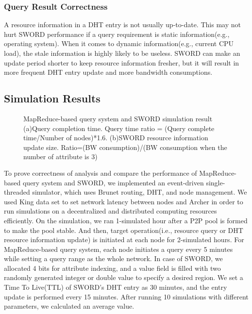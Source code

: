 \documentclass{acm_proc_article-sp}
\begin{document}
\subsubsection{Query Result Correctness}
A resource information in a DHT entry is not usually up-to-date. This may not hurt SWORD performance if a query requirement is static information(e.g., operating system). 
When it comes to dynamic information(e.g., current CPU load), the stale information is highly likely to be useless. 
SWORD can make an update period shorter to keep resource information fresher, but it will result in more frequent DHT entry update and more bandwidth consumptions.
\subsection{Simulation Results}
\begin{figure}[t]
\centering
{}
\caption{\label{fig:sim}MapReduce-based query system and SWORD simulation result (a)Query completion time. Query time ratio = (Query complete time/Number of nodes)*1.6. 
(b)SWORD resource information update size. Ratio=(BW consumption)/(BW consumption when the number of attribute is 3)}
\end{figure}
To prove correctness of analysis and compare the performance of MapReduce-based query system and SWORD, we implemented an event-driven single-threaded simulator, which uses Brunet\cite{brunet} routing, DHT, and node management.
We used King data set\cite{king} to set network latency between nodes and Archer\cite{archer} in order to run simulations on a decentralized and distributed computing resources efficiently. 
On the simulation, we ran 1-simulated hour after a P2P pool is formed to make the pool stable. And then, target operation(i.e., resource query or DHT resource information update) is initiated at each node for 2-simulated hours.
For MapReduce-based query system, each node initiates a query every 5 minutes while setting a query range as the whole network. 
In case of SWORD, we allocated 4 bits for attribute indexing, and a value field is filled with two randomly generated integer or double value to specify a desired region. 
We set a Time To Live(TTL) of SWORD's DHT entry as 30 minutes, and the entry update is performed every 15 minutes.
After running 10 simulations with different parameters, we calculated an average value.
\end{document}
